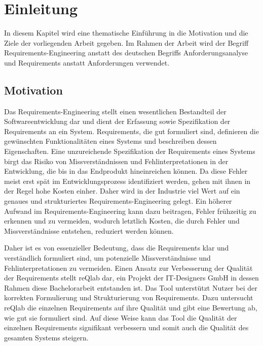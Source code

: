 \chapter{Einleitung} %

In diesem Kapitel wird eine thematische Einführung in die Motivation und die Ziele der vorliegenden Arbeit gegeben.
Im Rahmen der Arbeit wird der Begriff \glqq{}Requirements-Engineering\grqq{} anstatt des deutschen Begriffs \glqq{}Anforderungsanalyse\grqq{} und \glqq{}Requirements\grqq{} anstatt \glqq{}Anforderungen\grqq{} verwendet.

\section{Motivation}
\label{section:motivation}

Das Requirements-Engineering stellt einen wesentlichen Bestandteil der Softwareentwicklung dar und dient der Erfassung sowie Spezifikation der Requirements an ein System.
Requirements, die gut formuliert sind, definieren die gewünschten Funktionalitäten eines Systems und beschreiben dessen Eigenschaften.
Eine unzureichende Spezifikation der Requirements eines Systems birgt das Risiko von Missverständnissen und Fehlinterpretationen in der Entwicklung, die bis in das Endprodukt hineinreichen können.
Da diese Fehler meist erst spät im Entwicklungsprozess identifiziert werden, gehen mit ihnen in der Regel hohe Kosten einher.
Daher wird in der Industrie viel Wert auf ein genaues und strukturiertes Requirements-Engineering gelegt.
Ein höherer Aufwand im Requirements-Engineering kann dazu beitragen, Fehler frühzeitig zu erkennen und zu vermeiden, wodurch letztlich Kosten, die durch Fehler und Missverständnisse entstehen, reduziert werden können.

Daher ist es von essenzieller Bedeutung, dass die Requirements klar und verständlich formuliert sind, um potenzielle Missverständnisse und Fehlinterpretationen zu vermeiden.
Einen Ansatz zur Verbesserung der Qualität der Requirements stellt reQlab dar, ein Projekt der IT-Designers GmbH in dessen Rahmen diese Bachelorarbeit entstanden ist.
Das Tool unterstützt Nutzer bei der korrekten Formulierung und Strukturierung von Requirements.
Dazu untersucht reQlab die einzelnen Requirements auf ihre Qualität und gibt eine Bewertung ab, wie gut sie formuliert sind.
Auf diese Weise kann das Tool die Qualität der einzelnen Requirements signifikant verbessern und somit auch die Qualität des gesamten Systems steigern.

